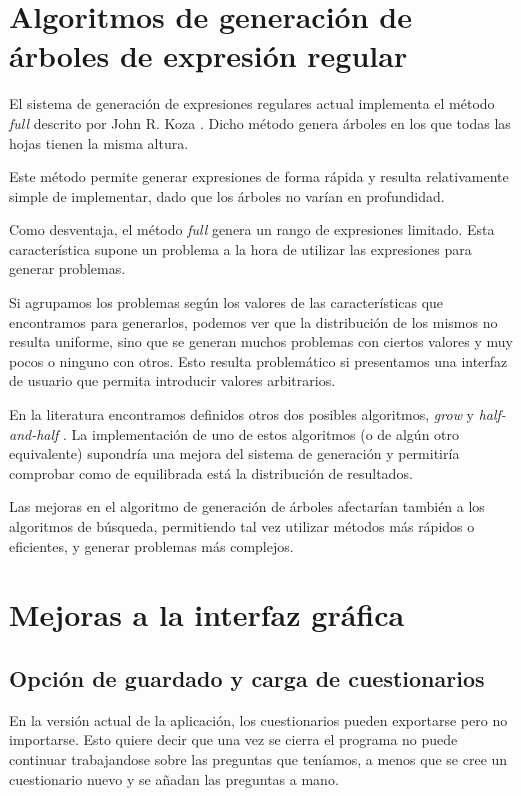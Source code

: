 
\section{Algoritmos de generación de árboles de expresión regular}
El sistema de generación de expresiones regulares actual implementa el método \emph{full} descrito por John R. Koza \cite{koza92}.
Dicho método genera árboles en los que todas las hojas tienen la misma altura.

Este método permite generar expresiones de forma rápida y resulta relativamente simple de implementar, dado que los árboles no varían en profundidad.

Como desventaja, el método \emph{full} genera un rango de expresiones limitado.
Esta característica supone un problema a la hora de utilizar las expresiones para generar problemas.

Si agrupamos los problemas según los valores de las características que encontramos para generarlos, podemos ver que la distribución de los mismos no resulta uniforme, sino que se generan muchos problemas con ciertos valores y muy pocos o ninguno con otros.
Esto resulta problemático si presentamos una interfaz de usuario que permita introducir valores arbitrarios.

En la literatura encontramos definidos otros dos posibles algoritmos, \emph{grow} y \emph{half-and-half} \cite{koza92}.
La implementación de uno de estos algoritmos (o de algún otro equivalente) supondría una mejora del sistema de generación y permitiría comprobar como de equilibrada está la distribución de resultados.

Las mejoras en el algoritmo de generación de árboles afectarían también a los algoritmos de búsqueda, permitiendo tal vez utilizar métodos más rápidos o eficientes, y generar problemas más complejos.

\section{Mejoras a la interfaz gráfica}
\subsection{Opción de guardado y carga de cuestionarios}
En la versión actual de la aplicación, los cuestionarios pueden exportarse pero no importarse.
Esto quiere decir que una vez se cierra el programa no puede continuar trabajandose sobre las preguntas que teníamos, a menos que se cree un cuestionario nuevo y se añadan las preguntas a mano.

